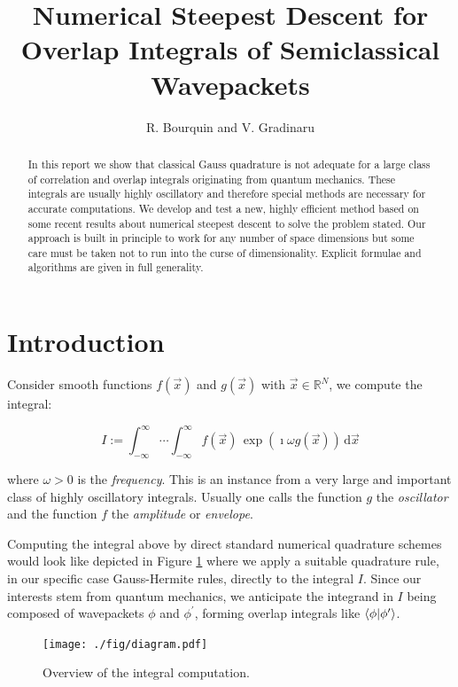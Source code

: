 \documentclass[a4paper,10pt]{article}
\title{Numerical Steepest Descent for Overlap Integrals of Semiclassical Wavepackets}
\author{R. Bourquin and V. Gradinaru}
\begin{document}
\maketitle

\begin{abstract}
  In this report we show that classical Gauss quadrature is not adequate for a large
  class of correlation and overlap integrals originating from quantum mechanics. These
  integrals are usually highly oscillatory and therefore special methods are necessary
  for accurate computations. We develop and test a new, highly efficient method based
  on some recent results about numerical steepest descent to solve the problem stated.
  Our approach is built in principle to work for any number of space dimensions but some
  care must be taken not to run into the curse of dimensionality. Explicit formulae and
  algorithms are given in full generality.
\end{abstract}


\section{Introduction}


Consider smooth functions $f(\vec{x})$ and $g(\vec{x})$ with $\vec{x} \in \mathbb{R}^N$,
we compute the integral:

\begin{equation} \label{eq:hoi}
 I := \int_{-\infty}^{\infty} \cdots \int_{-\infty}^{\infty}
      f(\vec{x}) \, \exp(\imath \omega g(\vec{x}))
      \, \mathrm{d} \vec{x}
\end{equation}

where $\omega > 0$ is the \emph{frequency}.
This is an instance from a very large and important class of highly oscillatory integrals.
Usually one calls the function $g$ the \emph{oscillator} and the function $f$ the
\emph{amplitude} or \emph{envelope}.

Computing the integral above by direct standard numerical quadrature schemes
would look like depicted in Figure \ref{fig:transformation_chain_1} where we apply a
suitable quadrature rule, in our specific case Gauss-Hermite rules, directly to the
integral $I$. Since our interests stem from quantum mechanics, we anticipate the
integrand in $I$ being composed of wavepackets $\phi$ and
$\phi^\prime$, forming overlap integrals like $\braket{\phi|\phi^\prime}$.

\begin{figure}[h!]
  \centering
  \texttt{[image: ./fig/diagram.pdf]}
  \caption{Overview of the integral computation.}
  \label{fig:transformation_chain_1}
\end{figure}
\end{document}
